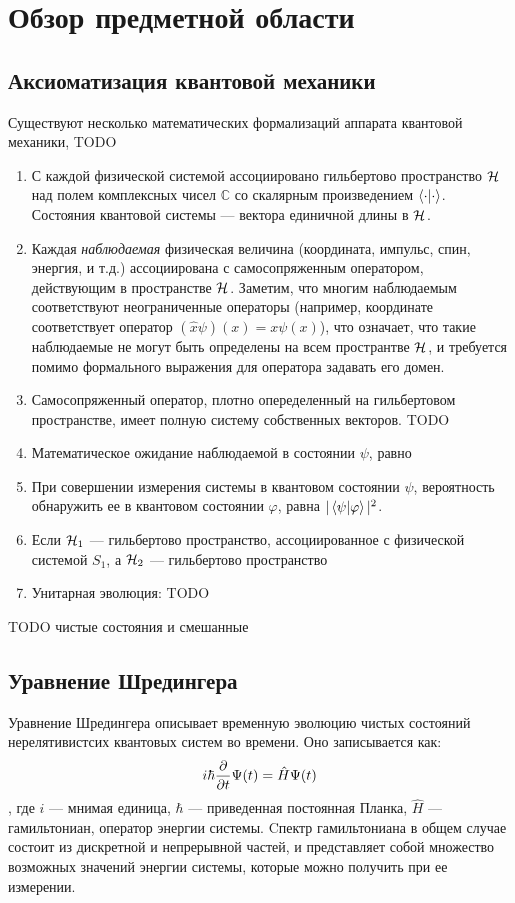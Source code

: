 \chapter{Обзор предметной области}
\label{chapter1}

\section{Аксиоматизация квантовой механики}


Существуют несколько математических формализаций аппарата квантовой механики, TODO

\begin{enumerate}
\item С каждой физической системой ассоциировано гильбертово пространство $\mathcal{H}_{}$ над полем комплексных чисел $\mathbb{C}$ со скалярным произведением $\ip{\cdot}{\cdot}$. Состояния квантовой системы — вектора единичной длины в $\mathcal{H}_{}$.
\item Каждая \textit{наблюдаемая} физическая величина (координата, импульс, спин, энергия, и т.д.) ассоциирована с самосопряженным оператором, действующим в пространстве $\mathcal{H}_{}$. Заметим, что многим наблюдаемым соответствуют неограниченные операторы (например, координате соответствует оператор $(\hat{x} \psi)(x) = x \psi(x)$), что означает, что такие наблюдаемые не могут быть определены на всем пространтве $\mathcal{H}_{}$, и требуется помимо формального выражения для оператора задавать его домен.
\item Самосопряженный оператор, плотно опеределенный на гильбертовом пространстве, имеет полную систему собственных векторов. TODO
\item Математическое ожидание наблюдаемой в состоянии $\psi$, равно 
\item При совершении измерения системы в квантовом состоянии $\psi$, вероятность обнаружить ее в квантовом состоянии $\varphi$, равна $|\ip{\psi}{\varphi}|^2$.
\item Если $\mathcal{H}_{1}$ — гильбертово пространство, ассоциированное с физической системой $S_1$, а $\mathcal{H}_{2}$ — гильбертово пространство
\item Унитарная эволюция: TODO
\end{enumerate}

TODO чистые состояния и смешанные

\section{Уравнение Шредингера}
Уравнение Шредингера описывает временную эволюцию чистых состояний нерелятивистсих квантовых систем во времени. Оно записывается как:
\[
i \hbar \pdv{t} \Psi(t) = \hat{H} \Psi(t)
\]
, где $i$ — мнимая единица, $\hbar$ — приведенная постоянная Планка, $\hat{H}$ — гамильтониан, оператор энергии системы. Cпектр гамильтониана в общем случае состоит из дискретной и непрерывной частей, и представляет собой множество возможных значений энергии системы, которые можно получить при ее измерении.

